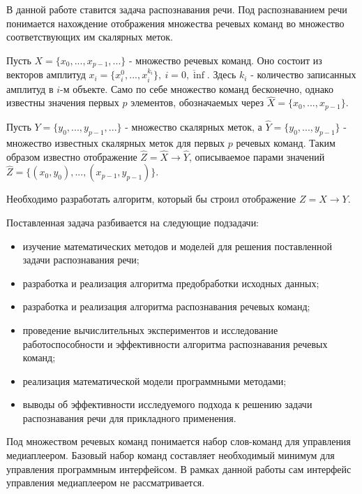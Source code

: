 В данной работе ставится задача распознавания речи. Под распознаванием речи понимается нахождение отображения множества речевых команд во множество соответствующих им скалярных меток. 

Пусть $X=\{x_0, ..., x_{p-1}, ...\}$ - множество речевых команд. Оно состоит из векторов амплитуд $x_i=\{x_i^0, ..., x_i^{k_i}\},~i=\overline{0,\inf}$. Здесь $k_i$ - количество записанных амплитуд в $i$-м объекте. Само по себе множество команд бесконечно, однако известны значения первых $p$ элементов, обозначаемых через $\widehat{X}=\{x_0, ..., x_{p-1}\}$.  

Пусть $Y=\{y_0, ..., y_{p-1}, ...\}$ - множество скалярных меток, а $\widehat{Y}=\{y_0, ..., y_{p-1}\}$ - множество известных скалярных меток для первых $p$ речевых команд. Таким образом известно отображение $\widehat{Z}=\widehat{X} \rightarrow \widehat{Y}$, описываемое парами значений $\widehat{Z}=\{(x_0, y_0), ..., (x_{p-1}, y_{p-1})\}$.

Необходимо разработать алгоритм, который бы строил отображение $Z = X \rightarrow Y$.

Поставленная задача разбивается на следующие подзадачи:
\begin{itemize}[leftmargin=2cm]
	\item изучение математических методов и моделей для решения поставленной задачи распознавания речи;
	\item разработка и реализация алгоритма предобработки исходных данных;
	\item разработка и реализация алгоритма распознавания речевых команд;
	\item проведение вычислительных экспериментов и исследование работоспособности и эффективности алгоритма распознавания речевых команд;
	\item реализация математической модели программными методами;
	\item выводы об эффективности исследуемого подхода к решению задачи распознавания речи для прикладного применения.
\end{itemize}

Под множеством речевых команд понимается набор слов-команд для управления медиаплеером. Базовый набор команд составляет необходимый минимум для управления программным интерфейсом. В рамках данной работы сам интерфейс управления медиаплеером не рассматривается.